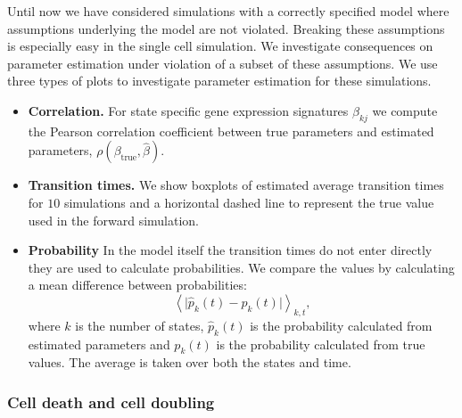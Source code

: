 Until now we have considered simulations with a correctly specified model where assumptions underlying the model are not violated. Breaking these assumptions is especially easy in the single cell simulation. We investigate consequences on parameter estimation under violation of a subset of these assumptions. We use three types of plots to investigate parameter estimation for these simulations. 

\begin{itemize}
\item {\bf Correlation.} For state specific gene expression signatures $\beta_{kj}$ we compute the Pearson correlation coefficient between true parameters and estimated parameters, $\rho(\beta_{\mathrm{true}},\hat{\beta})$.
\item {\bf Transition times.} We show boxplots of estimated average transition times for $10$ simulations and a horizontal dashed line to represent the true value used in the forward simulation.
\item {\bf Probability} In the model itself the transition times do not enter directly they are used to calculate probabilities. We compare the values by calculating a mean difference between probabilities:
\begin{equation}
  \label{eq:1}
  \left< \lvert \hat{p}_k(t) - p_k(t) \rvert \right>_{k,t}, 
\end{equation}
where $k$ is the number of states, $\hat{p}_k(t)$ is the probability calculated from estimated parameters and $p_k(t)$ is
the probability calculated from true values. The average is taken over both the states and time. 
\end{itemize}



\subsubsection{Cell death and cell doubling}
\label{sec:death-duplication}

